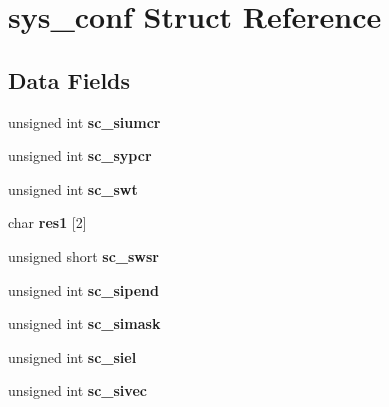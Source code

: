\hypertarget{structsys__conf}{}\section{sys\+\_\+conf Struct Reference}
\label{structsys__conf}
\subsection*{Data Fields}
\begin{DoxyCompactItemize}
\item 
\mbox{\label{structsys__conf_a17871563f679109640c092c128461b77}} 
unsigned int {\bfseries sc\+\_\+siumcr}
\item 
\mbox{\label{structsys__conf_af08624a9d581b94abca480613936b9ae}} 
unsigned int {\bfseries sc\+\_\+sypcr}
\item 
\mbox{\label{structsys__conf_a17f700faf6445927af6e2ede0a33986c}} 
unsigned int {\bfseries sc\+\_\+swt}
\item 
\mbox{\label{structsys__conf_a273a8431589e6df904e67ef38842f9e4}} 
char {\bfseries res1} \mbox{[}2\mbox{]}
\item 
\mbox{\label{structsys__conf_a6adb0a601c7f15343817b57e3eb0ad15}} 
unsigned short {\bfseries sc\+\_\+swsr}
\item 
\mbox{\label{structsys__conf_ab00ec00c45c439c84cb1dcf22a29ff7c}} 
unsigned int {\bfseries sc\+\_\+sipend}
\item 
\mbox{\label{structsys__conf_ac2d557d7fde5a19758dc0b4ddafb5a4e}} 
unsigned int {\bfseries sc\+\_\+simask}
\item 
\mbox{\label{structsys__conf_a443cf911f6bb52aab8977547c6d9c263}} 
unsigned int {\bfseries sc\+\_\+siel}
\item 
\mbox{\label{structsys__conf_ab3bb85b62c69d111340464465aac86fa}} 
unsigned int {\bfseries sc\+\_\+sivec}
\item 
\mbox{\label{structsys__conf_af8361f150bdadca1c3443061eeea2d97}} 

\end{DoxyCompactItemize}

